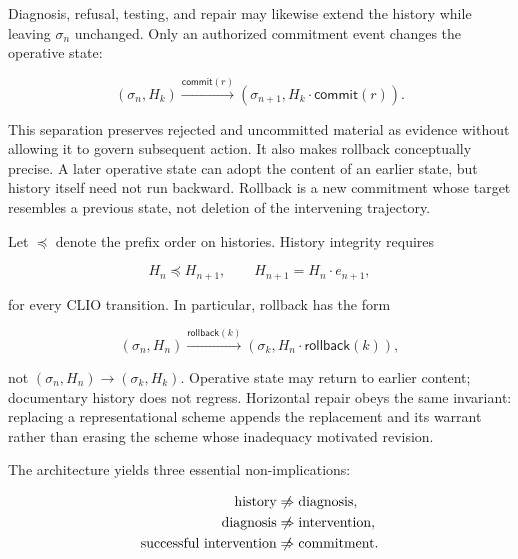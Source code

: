 \documentclass[11pt]{article}
\begin{document}
Diagnosis, refusal, testing, and repair may likewise extend the history while leaving $\sigma_n$ unchanged. Only an authorized commitment event changes the operative state:

\begin{equation}
(\sigma_n,H_k) \xrightarrow{\mathsf{commit}(r)}
(\sigma_{n+1},H_k\cdot \mathsf{commit}(r)).
\end{equation}

This separation preserves rejected and uncommitted material as evidence without allowing it to govern subsequent action. It also makes rollback conceptually precise. A later operative state can adopt the content of an earlier state, but history itself need not run backward. Rollback is a new commitment whose target resembles a previous state, not deletion of the intervening trajectory.

Let $\preceq$ denote the prefix order on histories. History integrity requires

\begin{equation}
H_n\preceq H_{n+1},
\qquad
H_{n+1}=H_n\cdot e_{n+1},
\label{eq:history-integrity}
\end{equation}

for every CLIO transition. In particular, rollback has the form

\begin{equation}
(\sigma_n,H_n)
\xrightarrow{\mathsf{rollback}(k)}
(\sigma_k,H_n\cdot\mathsf{rollback}(k)),
\label{eq:rollback}
\end{equation}

not $(\sigma_n,H_n)\to(\sigma_k,H_k)$. Operative state may return to earlier content; documentary history does not regress. Horizontal repair obeys the same invariant: replacing a representational scheme appends the replacement and its warrant rather than erasing the scheme whose inadequacy motivated revision.

The architecture yields three essential non-implications:

\begin{equation}
\begin{aligned}
\text{history} &\centernot\Rightarrow \text{diagnosis},\\
\text{diagnosis} &\centernot\Rightarrow \text{intervention},\\
\text{successful intervention} &\centernot\Rightarrow \text{commitment}.
\end{aligned}
\end{equation}
\end{document}
